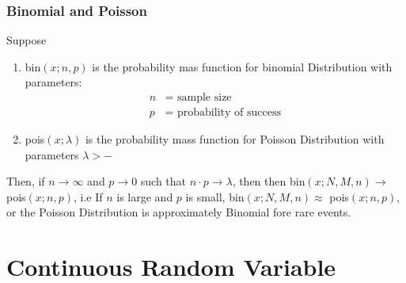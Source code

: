 \documentclass[11pt,oneside]{book}
\theoremstyle{newStyle}
\begin{document}
\subsection[Binomial and Poisson]{Binomial and Poisson}
Suppose \begin{enumerate}[itemsep=0pt, topsep=1pt, partopsep=0pt,label=(\alph*)]
\item bin$(x;n,p)$ is the probability mas function for binomial Distribution with parameters: \begin{align*}
n&=\text{ sample size}\\
p&=\text{ probability of success}
\end{align*}
\item pois$(x;\lambda)$ is the probability mass function for Poisson Distribution with parameters $\lambda>-$
\end{enumerate}
Then, if $n\to \infty$ and $p\to 0$ such that $n\cdot p\to \lambda$, then then bin$(x;N,M,n)\to$ pois$(x;n,p)$, i.e If $n$ is large and $p$ is small, bin$(x;N,M,n)\approx$ pois$(x;n,p)$, or the Poisson Distribution is approximately Binomial fore rare events. 
\chapter[Continuous Random Variable]{Continuous Random Variable}
\end{document}
